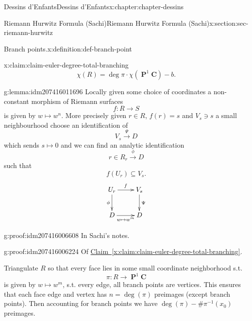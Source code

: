 \documentclass[oneside,10pt,]{book}
\numberwithin{equation}{section}
\newcommand{\inv}{^{-1}}
\newcommand{\CC}{\mathbf{C}}
\DeclareMathOperator{\PP}{\mathbf{P}}
\begin{document}
\begin{chapterptx}{Dessins d'Enfants}{}{Dessins d'Enfants}{}{}{x:chapter:chapter-dessins}
\begin{sectionptx}{Riemann Hurwitz Formula (Sachi)}{}{Riemann Hurwitz Formula (Sachi)}{}{}{x:section:sec-riemann-hurwitz}
\begin{definition}{Branch points.}{x:definition:def-branch-point}
\begin{equation*}
\end{equation*}
%
\end{definition}
\begin{claim}{}{}{x:claim:claim-euler-degree-total-branching}%
%
\begin{equation*}
\chi(R) = \deg \pi \cdot \chi(\PP^1\CC)  - b\text{.}
\end{equation*}
%
\end{claim}
\begin{lemma}{}{}{g:lemma:idm207416011696}%
Locally given some choice of coordinates a non-constant morphism of Riemann surfaces%
\begin{equation*}
f\colon R \to S
\end{equation*}
is given by \(w\mapsto w^n\). More precisely given \(r \in R\), \(f(r) = s\) and \(V_s \ni s\) a small neighbourhood choose an identification of%
\begin{equation*}
V_s \xrightarrow \Psi D
\end{equation*}
which sends \(s \mapsto 0\) and we can find an analytic identification%
\begin{equation*}
r\in R_r \xrightarrow \phi D
\end{equation*}
such that%
\begin{equation*}
f(U_r) \subseteq V_s\text{.}
\end{equation*}
%
\begin{equation*}
\xymatrix{U_r \ar[r]^f \ar[d]_\phi & V_s \ar[d]^\Psi \\ D \ar[r]_{w\mapsto w^m} & D}
\end{equation*}
%
\end{lemma}
\begin{proofptx}{}{g:proof:idm207416006608}
In Sachi's notes.%
\end{proofptx}
\begin{proofptx}{}{g:proof:idm207416006224}
Of \hyperref[x:claim:claim-euler-degree-total-branching]{Claim~\ref{x:claim:claim-euler-degree-total-branching}}.%
\par
Triangulate \(R\) so that every face lies in some small coordinate neighborhood s.t.%
\begin{equation*}
\pi \colon R\to \PP^1 \CC
\end{equation*}
is given by \(w \mapsto w^m\), s.t. every edge, all branch points are vertices. This ensures that each face edge and vertex has \(n  = \deg (\pi)\) preimages (except branch points). Then accounting for branch points we have \(\deg(\pi) -  \# \pi\inv (x_0)\) preimages.%
\end{proofptx}

\end{sectionptx}
\end{chapterptx}
\end{document}

